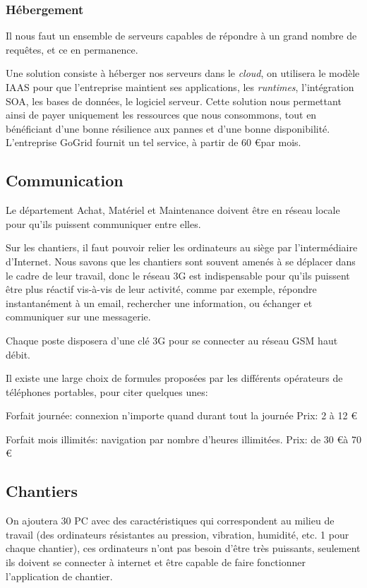 \documentclass[a4paper]{article}
\begin{document}
	\subsubsection{Hébergement}
    Il nous faut un ensemble de serveurs capables de répondre à un grand
    nombre de requêtes, et ce en permanence.

Une solution consiste à héberger nos serveurs dans le \textsl{cloud}, on utilisera le modèle IAAS pour  que l'entreprise 
maintient ses applications, les {\sl runtimes}, l'intégration SOA, les bases de données, le logiciel serveur.
Cette solution nous permettant ainsi de payer uniquement les ressources que nous consommons, tout en bénéficiant 
d'une bonne résilience aux pannes et d'une bonne disponibilité.
L'entreprise GoGrid fournit un tel service, à partir de 60 \euro par mois.


\subsection{Communication}
Le département Achat, Matériel et Maintenance doivent être en réseau locale pour qu'ils puissent  communiquer entre elles.

Sur les chantiers, il faut pouvoir relier les ordinateurs au siège par l'intermédiaire d'Internet. 
Nous savons que les chantiers
 sont souvent amenés à se déplacer dans le cadre de leur travail, donc le réseau 3G est indispensable 
pour qu'ils puissent être plus réactif vis-à-vis de leur activité, comme par exemple, répondre 
instantanément à un email, rechercher une information, ou échanger et communiquer sur une messagerie. 

Chaque poste disposera d’une clé 3G pour se connecter au réseau GSM haut débit.

Il existe une large choix de formules proposées par les différents opérateurs de téléphones portables, 
pour citer quelques unes:

Forfait journée: connexion n'importe quand durant tout la journée
Prix: 2 à 12 \euro

Forfait mois illimités: navigation par nombre d'heures illimitées.
Prix: de 30 \euro à 70 \euro


   

\subsection{Chantiers}
On ajoutera 30 PC avec des caractéristiques qui correspondent au milieu de travail (des ordinateurs résistantes 
au pression, vibration, humidité, etc. 1 pour chaque chantier), ces ordinateurs n'ont pas besoin d’être très puissants, 
seulement ils doivent se connecter à internet et être capable de faire fonctionner l'application de chantier.
\end{document}
